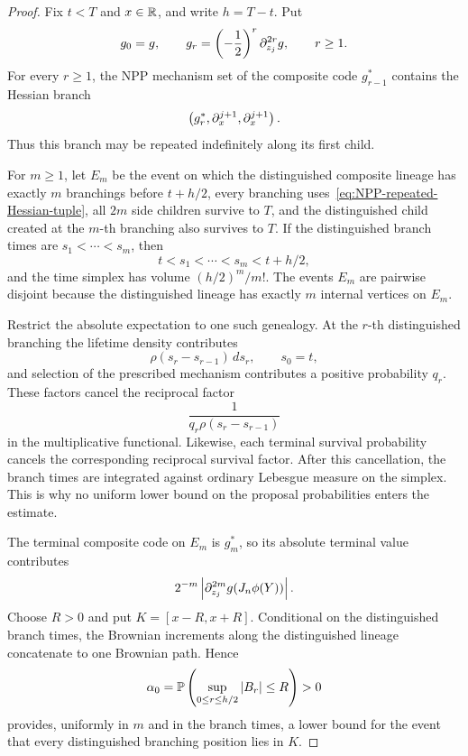 \begin{proof}
Fix $t<T$ and $x\in\mathbb R$, and write $h=T-t$. Put
\begin{equation*}
  g_0=g,
  \qquad
  g_r
  =
  \left(-\frac12\right)^r\partial_{z_j}^{2r}g,
  \qquad r\geq1.
\end{equation*}
For every $r\geq1$, the NPP mechanism set of the composite code $g_{r-1}^*$ contains the Hessian branch
\begin{equation}
  \left(
    g_r^*,
    \partial_x^{j+1},
    \partial_x^{j+1}
  \right).
  \label{eq:NPP-repeated-Hessian-tuple}
\end{equation}
Thus this branch may be repeated indefinitely along its first child.

For $m\geq1$, let $E_m$ be the event on which the distinguished composite lineage has exactly $m$ branchings before $t+h/2$, every branching uses~\eqref{eq:NPP-repeated-Hessian-tuple}, all $2m$ side children survive to $T$, and the distinguished child created at the $m$-th branching also survives to $T$. If the distinguished branch times are $s_1<\cdots<s_m$, then
\begin{equation*}
  t<s_1<\cdots<s_m<t+h/2,
\end{equation*}
and the time simplex has volume $(h/2)^m/m!$. The events $E_m$ are pairwise disjoint because the distinguished lineage has exactly $m$ internal vertices on $E_m$.

Restrict the absolute expectation to one such genealogy. At the $r$-th distinguished branching the lifetime density contributes
\begin{equation*}
  \rho(s_r-s_{r-1})\,ds_r,
  \qquad s_0=t,
\end{equation*}
and selection of the prescribed mechanism contributes a positive probability $q_r$. These factors cancel the reciprocal factor
\begin{equation*}
  \frac1{q_r\rho(s_r-s_{r-1})}
\end{equation*}
in the multiplicative functional. Likewise, each terminal survival probability cancels the corresponding reciprocal survival factor. After this cancellation, the branch times are integrated against ordinary Lebesgue measure on the simplex. This is why no uniform lower bound on the proposal probabilities enters the estimate.

The terminal composite code on $E_m$ is $g_m^*$, so its absolute terminal value contributes
\begin{equation}
  2^{-m}
  \left|\partial_{z_j}^{2m}g(J_n\phi(Y))\right|.
  \label{eq:NPP-terminal-composite}
\end{equation}
Choose $R>0$ and put $K=[x-R,x+R]$. Conditional on the distinguished branch times, the Brownian increments along the distinguished lineage concatenate to one Brownian path. Hence
\begin{equation*}
  \alpha_0
  =
  \mathbb P\left(
    \sup_{0\leq r\leq h/2}\left|B_r\right|\leq R
  \right)
  >0
\end{equation*}
provides, uniformly in $m$ and in the branch times, a lower bound for the event that every distinguished branching position lies in $K$.


\end{proof}
